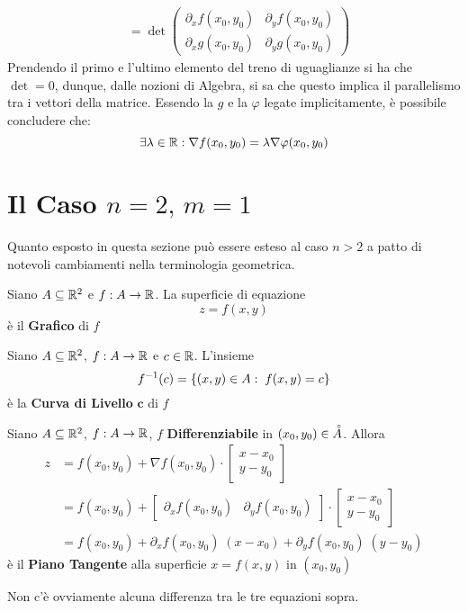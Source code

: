 \begin{example}
\begin{solution}
\begin{align*}
			&=	\det \left(
				\begin{matrix}
					\partial_xf(x_0,y_0) & \partial_yf(x_0,y_0)\\
					\partial_xg(x_0,y_0) & \partial_yg(x_0,y_0)
				\end{matrix}
				\right)
		\end{align*}
		Prendendo il primo e l'ultimo elemento del treno di uguaglianze si ha che $\det = 0$, dunque, dalle nozioni di Algebra, si sa che questo implica il parallelismo tra i vettori della matrice. Essendo la $g$ e la $\varphi$ legate implicitamente, è possibile concludere che:
		\[\exists \lambda \in \mathbb{R}: \nabla f(x_0,y_0) = \lambda \nabla \varphi(x_0,y_0)\]
	\end{solution}
\end{example}

\newpage
\section{Il Caso \texorpdfstring{$n=2,\,m=1$}{n=2, m=1}}
Quanto esposto in questa sezione può essere esteso al caso $n > 2$ a patto di notevoli cambiamenti nella terminologia geometrica.
\begin{definition}[Grafico]
	Siano $A \subseteq \mathbb{R}^2$ e $f: A \to \mathbb{R}$. La superficie di equazione
	\[z = f(x,y)\]
	è il \textbf{Grafico} di $f$
\end{definition}
\begin{definition}
	\label{def:curv_liv}
	Siano $A \subseteq \mathbb{R}^2$, $f: A \to \mathbb{R}$ e $c \in \mathbb{R}$. L'insieme
	\[f^{-1}(c) = \left\{(x,y) \in A:\; f(x,y) = c\right\}\]
	è la \textbf{Curva di Livello} $\boldsymbol{c}$ di $f$
\end{definition}
\begin{definition}
	Siano $A \subseteq \mathbb{R}^2$, $f: A \to \mathbb{R}$, $f$ \textbf{Differenziabile} in $(x_0, y_0) \in \accentset{\circ}{A}$. Allora
	\begin{align*}
		z &=
		f(x_0, y_0) +
		\nabla f(x_0, y_0) \cdot
		\begin{bmatrix}
			x - x_0\\
			y - y_0
		\end{bmatrix}\\
		&=
		f(x_0, y_0) +
		\begin{bmatrix}
			\partial_xf(x_0,y_0) & \partial_yf(x_0,y_0)
		\end{bmatrix}
		\cdot
		\begin{bmatrix}
			x - x_0\\
			y - y_0
		\end{bmatrix}\\
		&= f(x_0, y_0) + \partial_xf(x_0,y_0) \; (x - x_0) + \partial_yf(x_0,y_0) \; (y - y_0)
	\end{align*}
	è il \textbf{Piano Tangente} alla superficie $x = f(x,y)$ in $(x_0, y_0)$
	\begin{note}
		Non c'è ovviamente alcuna differenza tra le tre equazioni sopra.
	\end{note}
\end{definition}
